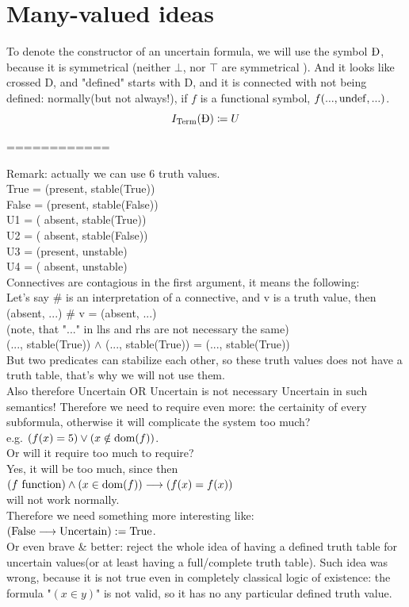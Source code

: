 \def\topic{many-valued}

\section{Many-valued ideas}

To denote the constructor of an uncertain formula, we will use the symbol $\uncert$, because it is symmetrical (neither $\bot$, nor $\top$ are  symmetrical ). And it looks like crossed D, and "defined" starts with D, and it is connected with not being defined: normally(but not always!), if $f$ is a functional symbol, $f(...,\mathrm{undef},...)$.\\
\[
I_\Term(\uncert) \coloneqq U
\]

============

Remark: actually we can use 6 truth values.\\
 True = (present, stable(True))\\
False = (present, stable(False))\\
U1    = ( absent, stable(True))\\
U2    = ( absent, stable(False))\\
U3    = (present, unstable)\\
U4    = ( absent, unstable)\\
Connectives are contagious in the first argument, it means the following:\\
Let's say \# is an interpretation of a connective, and v is a truth value, then\\
 (absent, ...) \# v = (absent, ...)\\
 (note, that "..." in lhs and rhs are not necessary the same)\\
 (..., stable(True)) $\land$ (..., stable(True)) =  (..., stable(True))\\
But two predicates can stabilize each other, so these truth values does not have a truth table, that's why we will not use them.\\

Also therefore Uncertain OR Uncertain is not necessary Uncertain in such semantics!
Therefore we need to require even more: the certainity of every subformula, otherwise it will complicate the system too much?\\

e.g. $(f(x)=5) \lor (x\notin\mathrm{dom}(f))$.\\
Or will it require too much to require?\\
Yes, it will be too much, since then\\
$(f\mathrm{\ function})\land(x\in\mathrm{dom}(f)) \longrightarrow (f(x)=f(x))$\\
will not work normally.\\
Therefore we need something more interesting like:\\
 $(\mathrm{False}\longrightarrow\mathrm{Uncertain}) := \mathrm{True}$.\\
Or even brave \& better: reject the whole idea of having a defined truth table for uncertain values(or at least having a full/complete truth table).
Such idea was wrong, because it is not true even in completely classical logic of existence: the formula "$(x\in y)$" is not valid, so it has no any particular defined truth value.\\

